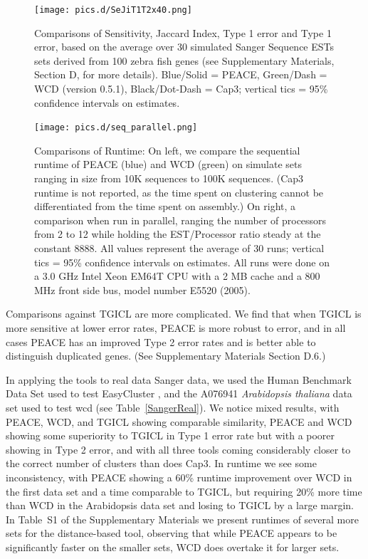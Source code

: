 \documentclass[a4,center,fleqn]{NAR}
\newcommand{\mc}[1]{#1}
\newcommand{\peace} {{\small PEACE}}
\newcommand{\wcd} {{\small WCD}}
\newcommand{\capthree} {{\small Cap3}}
\newcommand{\easycluster} {{\small EasyCluster}}
\newcommand{\tgicl} {{\small TGICL}}
\begin{document}
\begin{figure}
  \centerline{\texttt{[image: pics.d/SeJiT1T2x40.png]}}
  \caption{Comparisons of Sensitivity, Jaccard Index, Type 1 error and
    Type 1 error, based on the average over 30 simulated Sanger
    Sequence ESTs sets derived from 100 zebra fish genes (see
    Supplementary Materials, Section D, for more details).  Blue/Solid
    = \peace, Green/Dash = \wcd\/ \mc{(version 0.5.1)}, Black/Dot-Dash =
    \capthree; vertical tics = 95\% confidence intervals on estimates.}\label{SeJiT1T2}
\end{figure}

\begin{figure}
   \centerline{\texttt{[image: pics.d/seq\_parallel.png]}}
   \caption{Comparisons of Runtime: On left, we compare the sequential
     runtime of \peace\/ (blue) and \wcd\/ (green) on simulate sets
     ranging in size from 10K sequences to 100K sequences.  (\capthree\/
     runtime is not reported, as the time spent on clustering cannot
     be differentiated from the time spent on assembly.)  On right,
     a comparison when run in parallel, ranging the number of
     processors from 2 to 12 while holding the EST/Processor ratio
     steady at the constant 8888.  All values represent the average
     of 30 runs; vertical tics = 95\% confidence intervals on
     estimates.  All runs were done on a 3.0 GHz Intel Xeon EM64T CPU with a 2 MB
     cache and a 800 MHz front side bus, model number E5520 (2005).}\label{seq_parallel}
\end{figure}

Comparisons against \tgicl\/ \cite{Pertea2003} are more complicated.
We find that when \tgicl\/ is more sensitive at lower error rates,
\peace\/ is more robust to error, and in all cases \peace\/ has an
improved Type 2 error rates and is better able to distinguish
duplicated genes.  (See Supplementary Materials Section D.6.)


In applying the tools to real data Sanger data, we used the Human
Benchmark Data Set used to test \easycluster\/ \cite{Picardi09}, and
the A076941 {\it Arabidopsis thaliana} data set used to test wcd\/
\cite{Hazelhurst08a} (see Table~\ref{SangerReal}).  We notice mixed
results, with \peace, \wcd, and \tgicl\/ showing comparable similarity,
\peace\/ and \wcd\/ showing some superiority to \tgicl\/ in Type 1 error
rate but with a poorer showing in Type 2 error, and with all three
tools coming considerably closer to the correct number of clusters
than does \capthree.  In runtime we see some inconsistency, with
\peace\/ showing a 60\% runtime improvement over \wcd\/ in the first
data set and a time comparable to \tgicl, but requiring 20\% more time
than \wcd\/ in the Arabidopsis data set and losing to \tgicl\/ by a
large margin.  In Table~S1 of the Supplementary Materials we present
runtimes of several more sets for the distance-based tool, observing
that while \peace\/ appears to be significantly faster on the smaller
sets, \wcd\/ does overtake it for larger sets.
\end{document}
